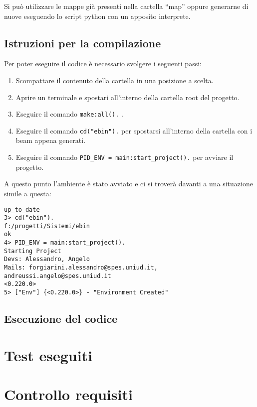Si può utilizzare le mappe già presenti nella cartella ``map'' oppure generarne di nuove eseguendo lo script python con un apposito interprete.
\subsection{Istruzioni per la compilazione}\label{istruzioni_compilazione}
Per poter eseguire il codice è necessario svolgere i seguenti passi:
\begin{enumerate}
	\item Scompattare il contenuto della cartella in una posizione a scelta.
	\item Aprire un terminale e spostari all'interno della cartella root del progetto.
	\item Eseguire il comando \lstinline |make:all().| .
	\item Eseguire il comando \lstinline |cd("ebin").| per spostarsi all'interno della cartella con i beam appena generati.
	\item Eseguire il comando \lstinline |PID_ENV = main:start_project().| per avviare il progetto.
\end{enumerate}
A questo punto l'ambiente è stato avviato e ci si troverà davanti a una situazione simile a questa:

\begin{lstlisting}
up_to_date
3> cd("ebin").
f:/progetti/Sistemi/ebin
ok
4> PID_ENV = main:start_project().
Starting Project
Devs: Alessandro, Angelo
Mails: forgiarini.alessandro@spes.uniud.it, andreussi.angelo@spes.uniud.it
<0.220.0>
5> ["Env"] {<0.220.0>} - "Environment Created"
\end{lstlisting}

\subsection{Esecuzione del codice}


\section{Test eseguiti}

\section{Controllo requisiti}